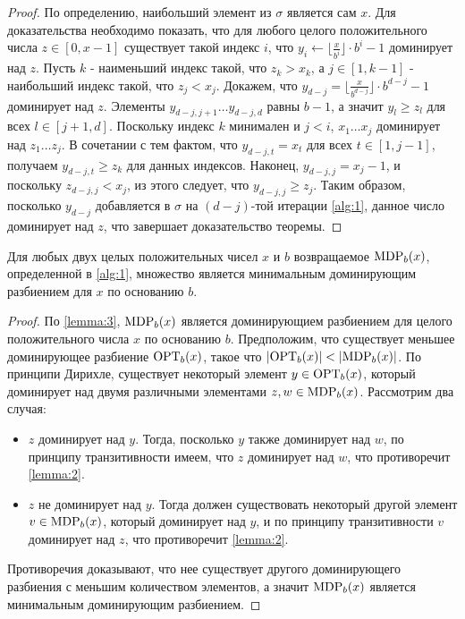 \begin{proof}
	По определению, наибольший элемент из $\sigma$ является сам $x$.
	Для доказательства необходимо показать, что для любого целого положительного числа $z \in [0, x - 1]$ существует такой индекс $i$, что $y_i \leftarrow \lfloor \frac{x}{b^i} \rfloor \cdot b^i - 1$ доминирует над $z$.
	Пусть $k$ - наименьший индекс такой, что $z_k > x_k$, а $j \in [1, k - 1]$ - наибольший индекс такой, что $z_j < x_j$.
	Докажем, что $y_{d - j} = \lfloor \frac{x}{b^{d - j}} \rfloor \cdot b^{d - j} - 1$ доминирует над $z$.
	Элементы $y_{d - j, j + 1} \dots y_{d - j, d}$ равны $b - 1$, а значит $y_l \geq z_l$ для всех $l \in [j + 1, d]$.
	Поскольку индекс $k$ минимален и $j < i$, $x_1 \dots x_j$ доминирует над $z_1 \dots z_j$.
	В сочетании с тем фактом, что $y_{d - j, t} = x_t$ для всех $t \in [1, j - 1]$, получаем $y_{d - j, t} \geq z_k$ для данных индексов.
	Наконец, $y_{d - j, j} = x_j - 1$, и поскольку $z_{d - j, j} < x_j$, из этого следует, что $y_{d - j, j} \geq z_j$.
	Таким образом, посколько $y_{d - j}$ добавляется в $\sigma$ на $(d - j)$-той итерации \ref{alg:1}, данное число доминирует над $z$, что завершает доказательство теоремы.
\end{proof}

\begin{theorem}
	\label{theorem:1}
	Для любых двух целых положительных чисел $x$ и $b$ возвращаемое $\text{MDP}_b(x)$, определенной в \ref{alg:1}, множество является минимальным доминирующим разбиением для $x$ по основанию $b$.
\end{theorem}

\begin{proof}
	 По \ref{lemma:3}, $\text{MDP}_b(x)$ является доминирующием разбиением для целого положительного числа $x$ по основанию $b$.
	Предположим, что существует меньшее доминирующее разбиение $\text{OPT}_b(x)$, такое что $|\text{OPT}_b(x)| < |\text{MDP}_b(x)|$.
	По принципи Дирихле, существует некоторый элемент $y \in \text{OPT}_b(x)$, который доминирует над двумя различными элементами $z, w \in \text{MDP}_b(x)$.
	Рассмотрим два случая:
	\begin{itemize}
		\item $z$ доминирует над $y$. Тогда, посколько $y$ также доминирует над $w$, по принципу транзитивности имеем, что $z$ доминирует над $w$, что противоречит \ref{lemma:2}.
		\item $z$ не доминирует над $y$. Тогда должен существовать некоторый другой элемент $v \in \text{MDP}_b(x)$, который доминирует над $y$, и по принципу транзитивности $v$ доминирует над $z$, что противоречит \ref{lemma:2}.
	\end{itemize}
	Противоречия доказывают, что нее существует другого доминирующего разбиения с меньшим количеством элементов, а значит $\text{MDP}_b(x)$ является минимальным доминирующим разбиением.
\end{proof}

